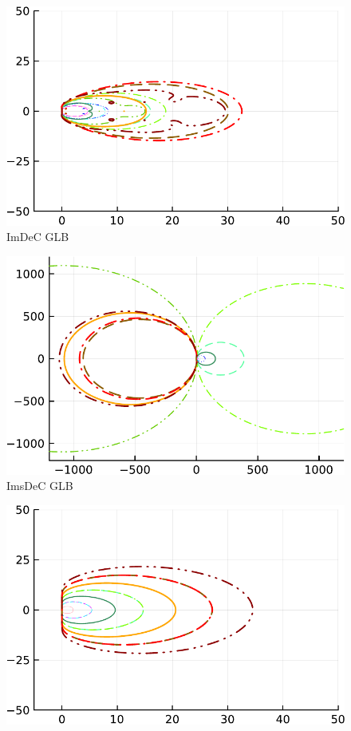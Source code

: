 \begin{figure}
\begin{minipage}[t]{0.32\textwidth}
		\includegraphics[width=\textwidth, trim={0 0 0 22}, clip]{pdf/odepics/IMDeC_GLB_ord13-crop.pdf}\\
		ImDeC GLB
	\end{minipage}
	\begin{minipage}[t]{0.32\textwidth}
		\centering
	\includegraphics[width=\textwidth, trim={0 0 0 22}, clip]{pdf/odepics/IMsDeC_GLB_ord13-crop.pdf}\\
	ImsDeC GLB
	\end{minipage}
	\begin{minipage}[t]{0.32\textwidth}
		\centering
		\includegraphics[width=\textwidth, trim={0 0 0 22}, clip]{pdf/odepics/IMADER_GLB_ord13-crop.pdf}\\

\end{minipage}
\end{figure}
